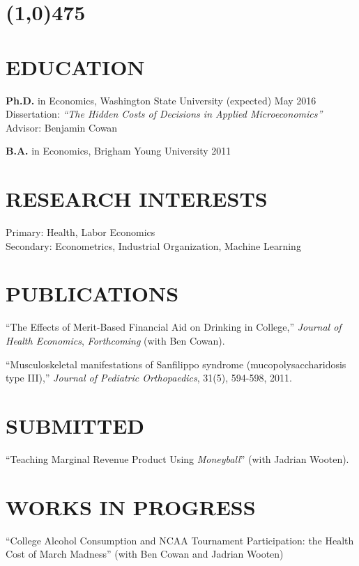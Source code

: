 \documentclass[margin]{res}  %
\begin{document}
\begin{resume} 
\section{\line(1,0){475}} %

\section{\textnormal{EDUCATION}} 
\textbf{Ph.D.} in Economics, Washington State University \hfill (expected) May 2016 \\
Dissertation: \emph{``The Hidden Costs of Decisions in Applied Microeconomics''}\\
Advisor: Benjamin Cowan

\textbf{B.A.} in Economics, Brigham Young University \hfill 2011

\section{\textnormal{RESEARCH INTERESTS}}
Primary: Health, Labor Economics \\
Secondary: Econometrics, Industrial Organization, Machine Learning

\section{\textnormal{PUBLICATIONS}}

``The Effects of Merit-Based Financial Aid on Drinking in College,'' {\it Journal of Health Economics}, \emph{Forthcoming} (with Ben Cowan).

``Musculoskeletal manifestations of Sanfilippo syndrome (mucopolysaccharidosis type III),'' {\it Journal of Pediatric Orthopaedics}, 31(5), 594-598, 2011.
 
\section{\textnormal{SUBMITTED}}
``Teaching Marginal Revenue Product Using \emph{Moneyball}'' (with Jadrian Wooten).

\section{\textnormal{WORKS IN PROGRESS}}

``College Alcohol Consumption and NCAA Tournament Participation: the Health Cost of March Madness'' (with Ben Cowan and Jadrian Wooten)


\end{resume}
\end{document}
